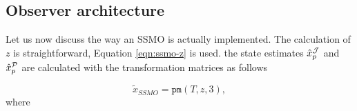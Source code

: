 \subsection{Observer architecture}\label{subsec:ssmo-architecture}
Let us now discuss the way an SSMO is actually implemented. The calculation of $z$ is straightforward, Equation \eqref{eqn:ssmo-z} is used. the state estimates $\hat{x}^{\mathcal{J}}_{p}$ and $\hat{x}^{\mathcal{P}}_p$ are calculated with the transformation matrices as follows

\begin{equation*}
    \tilde{x}_{SSMO} = \texttt{pm}(T,z,3),
\end{equation*}
where
\begin{center}
            
        
        
        
        
        
        
            

\end{center}
